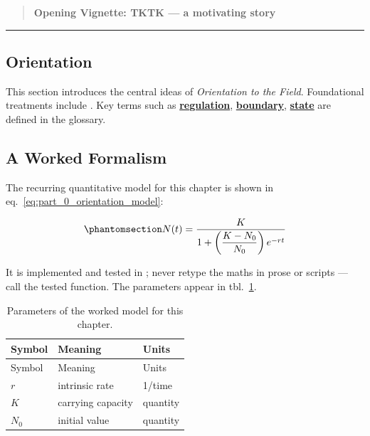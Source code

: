 \documentclass[
]{article}
\theoremstyle{plain}
\theoremstyle{definition}
\begin{document}
\begin{quote}
\textbf{Opening Vignette: TKTK --- a motivating story}
\end{quote}

\begin{center}\rule{0.5\linewidth}{0.5pt}\end{center}

\subsection{Orientation}\label{orientation}

This section introduces the central ideas of \emph{Orientation to the
Field}. Foundational treatments include
\citep{kim2020data, brown2017principles}. Key terms such as
\hyperref[gl:regulation]{\textbf{regulation}},
\hyperref[gl:boundary]{\textbf{boundary}},
\hyperref[gl:state]{\textbf{state}} are defined in the glossary.

\subsection{A Worked Formalism}\label{a-worked-formalism}

The recurring quantitative model for this chapter is shown in
eq.~\ref{eq:part_0_orientation_model}:

\begin{equation}\protect\phantomsection\label{eq:part_0_orientation_model}{ N(t) = \frac{K}{1 + \left(\dfrac{K - N_0}{N_0}\right) e^{-rt}} }\end{equation}

It is implemented and tested in
; never retype the maths in
prose or scripts --- call the tested function. The parameters appear in
tbl.~\ref{tbl:part_0_orientation_parameters}.

\begin{longtable}[]{@{}lll@{}}
\caption{Parameters of the worked model for this
chapter.}\label{tbl:part_0_orientation_parameters}\tabularnewline
\toprule\noalign{}
Symbol & Meaning & Units \\
\midrule\noalign{}
\endfirsthead
\toprule\noalign{}
Symbol & Meaning & Units \\
\midrule\noalign{}
\endhead
\bottomrule\noalign{}
\endlastfoot
\(r\) & intrinsic rate & 1/time \\
\(K\) & carrying capacity & quantity \\
\(N_0\) & initial value & quantity \\
\end{longtable}
\end{document}
